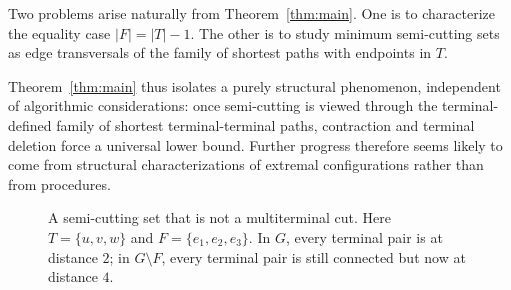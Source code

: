 \documentclass[11pt,a4paper]{amsart}
\theoremstyle{definition}
\theoremstyle{plain}
\begin{document}
Two problems arise naturally from Theorem~\ref{thm:main}. One is to characterize the equality case $|F|=|T|-1$. The other is to study minimum semi-cutting sets as edge transversals of the family of shortest paths with endpoints in $T$.

Theorem~\ref{thm:main} thus isolates a purely structural phenomenon, independent of algorithmic considerations: once semi-cutting is viewed through the terminal-defined family of shortest terminal-terminal paths, contraction and terminal deletion force a universal lower bound. Further progress therefore seems likely to come from structural characterizations of extremal configurations rather than from procedures.

\begin{figure}[t]
\centering
{}
\caption{A semi-cutting set that is not a multiterminal cut. Here $T=\{u,v,w\}$ and $F=\{e_1,e_2,e_3\}$. In $G$, every terminal pair is at distance $2$; in $G\setminus F$, every terminal pair is still connected but now at distance $4$.}
\label{fig:not-multiterminal}
\end{figure}
\end{document}
